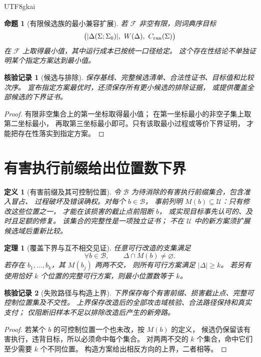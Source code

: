 \documentclass[12pt,a4paper,openany]{report}
\newtheorem{definition}{定义}[chapter]
\newtheorem{theorem}{定理}[chapter]
\newtheorem{proposition}{命题}[chapter]
\newtheorem{Certificate}{核验记录}[chapter]
\begin{document}
\begin{CJK*}{UTF8}{gkai}
\begin{proposition}[有限候选族的最小兼容扩展]
\label{prop:finite-min}
若 \(\mathcal F\) 非空有限，则词典序目标
\[
\bigl(|\Delta(\Sigma;\Sigma_0)|,\ W(\Delta),\ C_{\rm run}(\Sigma)\bigr)
\]
在 \(\mathcal F\) 上取得最小值，其中运行成本已按统一口径给定。
这个存在性结论不单独证明某个指定方案达到最小值。
\end{proposition}
\begin{Certificate}[候选与排除]
保存基线、完整候选清单、合法性证书、目标值和比较次序。
宣布指定方案最优时，还须保存所有更小候选的排除证据，
或提供覆盖全部候选的下界证书。
\end{Certificate}
\begin{proof}
有限非空集合上的第一坐标取得最小值；
在第一坐标最小的非空子集上取第二坐标最小，
再取第三坐标最小即可。只有该取最小过程或等价下界证明，
才能把存在性落实到指定方案。
\end{proof}

\section{有害执行前缀给出位置数下界}
\begin{definition}[有害前缀及其可控制位置]
令 \(\mathcal B\) 为待消除的有害执行前缀集合，包含准入冒占、
过程破坏及错误确权。对每个 \(b\in\mathcal B\)，
事前列明 \(M(b)\subseteq\mathcal U\)：只有修改这些位置之一，
才能在该损害的截止点前阻断 \(b\)，
或实现目标事先认可的、及时且足额的修复。
该集合的完整性是一项独立证书；
不在 \(\mathcal U\) 中的新方案须扩展候选域后重新比较。
\end{definition}

\begin{theorem}[覆盖下界与互不相交见证]
\label{thm:hitting}
任意可行改造的支集满足
\[
\forall b\in\mathcal B,\qquad
\Delta\cap M(b)\ne\varnothing.
\]
若存在 \(b_1,\ldots,b_k\)，其 \(M(b_j)\) 两两不交，
则所有可行方案满足 \(|\Delta|\ge k\)。
若另有使用恰好 \(k\) 个位置的完整可行方案，则最小位置数等于 \(k\)。
\end{theorem}
\begin{Certificate}[失败路径与构造上界]
下界保存每个有害前缀、损害截止点、完整可控制位置集及不交性。
上界保存改造后的全部攻击域核验、合法路径保持和真实支付；
仅阻断旧样本不足以排除改造后产生的新旁路。
\end{Certificate}
\begin{proof}
若某个 \(b\) 的可控制位置一个也未改，按 \(M(b)\) 的定义，
候选仍保留该有害执行，违背目标，所以必须命中每个集合。
对两两不交的 \(k\) 个集合，命中它们至少需要 \(k\) 个不同位置。
构造方案给出相反方向的上界，二者相等。
\end{proof}


\end{CJK*}
\end{document}

